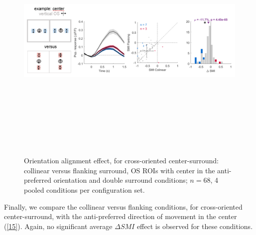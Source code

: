 \begin{figure}[H] \centering \includegraphics[width=12cm,height=12cm,keepaspectratio]{Figures/7.Results/finalPopulation/sel/diagrams/14.png} 
\caption{Orientation alignment effect, for cross-oriented center-surround: collinear versus flanking surround, OS ROIs with center in the anti-preferred orientation and double surround conditions;  $n=68$, 4 pooled conditions per configuration set.} \label{14}  
\end{figure}

Finally, we compare the collinear versus flanking conditions, for cross-oriented center-surround, with the anti-preferred direction of movement in the center (\ref{15}). Again, no significant average $\Delta SMI$ effect is observed for these conditions.


